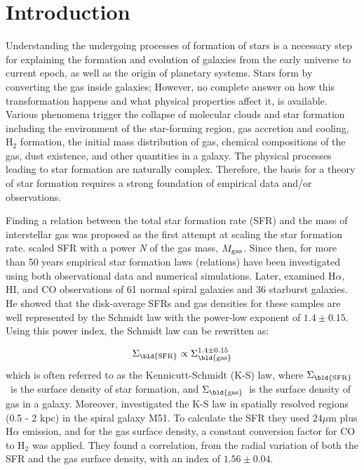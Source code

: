\documentclass[useAMS,usenatbib]{mn2e}
\newcommand \sigmagas    {$\Sigma_{\rm \bld {gas }} $\ }
\newcommand \eqsigmagas    {\Sigma_{\rm \bld {gas }}}
\newcommand \sigmasfr     {$\Sigma_{\rm \bld {SFR }} $\ }
\newcommand \eqsigmasfr     {\Sigma_{\rm \bld {SFR }}}
\begin{document}
\section{Introduction}
\label{sec:intro}

Understanding the undergoing processes of formation of stars is a necessary step for explaining the formation and evolution of galaxies from the early universe to current epoch, as well as the origin of planetary systems. Stars form by converting the gas inside galaxies; However, no complete answer on how this transformation happens and what physical properties affect it, is available. Various phenomena trigger the collapse of molecular clouds and star formation including the environment of the star-forming region, gas accretion and cooling, H$_2$ formation, the initial mass distribution of gas, chemical compositions of the gas,  dust existence, and other quantities in a galaxy. The physical processes leading to star formation are naturally complex. Therefore, the basis for a theory of star formation requires a strong foundation of empirical data and/or observations.

Finding a relation between the total star formation rate (SFR) and the mass of interstellar gas was proposed as the first attempt at scaling the star formation rate. \cite{Schmidt59} scaled SFR with a power {\it N} of the gas mass, $M_{\rm gas}$. Since then, for more than 50 years empirical star formation laws (relations) have been investigated using both observational data and numerical simulations. Later, \cite{Kennicutt98a} examined H$\alpha$, HI, and CO observations of 61 normal spiral galaxies and 36 starburst galaxies. He showed that the disk-average SFRs and gas densities for these samples are well represented by the Schmidt law with the power-low exponent of $1.4 \pm 0.15$. Using this power index, the Schmidt law can be rewritten as: %

\begin{equation}
\label{equ:ks_org}
\eqsigmasfr \propto \eqsigmagas^{1.4\pm0.15}
\end{equation}
which is often referred to as the Kennicutt-Schmidt (K-S) law, where \sigmasfr is the surface density of star formation, and \sigmagas is the surface density of gas in a galaxy. Moreover, \cite{Kennicutt07} investigated the K-S law in spatially resolved regions (0.5 - 2 kpc) in the spiral galaxy M51. To calculate the SFR they used $24 \mu$m plus H${\alpha}$ emission, and for the gas surface density, a constant conversion factor for CO to H$_2$ was applied. They found a correlation, from the radial variation of both the SFR and the gas surface density, with an index of $1.56 \pm 0.04$. %
\end{document}
